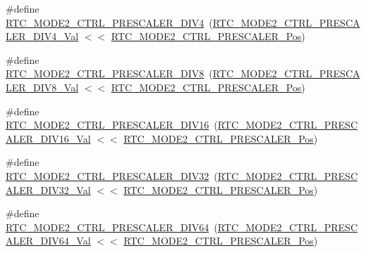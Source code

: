 \begin{DoxyCompactItemize}
\#define \mbox{\hyperlink{group___s_a_m_d21___r_t_c_gaa1062ef2e49ada873506ff5192c86530}{R\+T\+C\+\_\+\+M\+O\+D\+E2\+\_\+\+C\+T\+R\+L\+\_\+\+P\+R\+E\+S\+C\+A\+L\+E\+R\+\_\+\+D\+I\+V4}}~(\mbox{\hyperlink{group___s_a_m_d21___r_t_c_ga7075835115eb6138d8a729068575f7c8}{R\+T\+C\+\_\+\+M\+O\+D\+E2\+\_\+\+C\+T\+R\+L\+\_\+\+P\+R\+E\+S\+C\+A\+L\+E\+R\+\_\+\+D\+I\+V4\+\_\+\+Val}} $<$$<$ \mbox{\hyperlink{group___s_a_m_d21___r_t_c_gab49acaac9629f089845263f149b8a6c0}{R\+T\+C\+\_\+\+M\+O\+D\+E2\+\_\+\+C\+T\+R\+L\+\_\+\+P\+R\+E\+S\+C\+A\+L\+E\+R\+\_\+\+Pos}})
\item 
\#define \mbox{\hyperlink{group___s_a_m_d21___r_t_c_gaa1a6645f4cf5374a82ed8b5401b3302b}{R\+T\+C\+\_\+\+M\+O\+D\+E2\+\_\+\+C\+T\+R\+L\+\_\+\+P\+R\+E\+S\+C\+A\+L\+E\+R\+\_\+\+D\+I\+V8}}~(\mbox{\hyperlink{group___s_a_m_d21___r_t_c_gac387bb79731665371da7bfbd1487dec0}{R\+T\+C\+\_\+\+M\+O\+D\+E2\+\_\+\+C\+T\+R\+L\+\_\+\+P\+R\+E\+S\+C\+A\+L\+E\+R\+\_\+\+D\+I\+V8\+\_\+\+Val}} $<$$<$ \mbox{\hyperlink{group___s_a_m_d21___r_t_c_gab49acaac9629f089845263f149b8a6c0}{R\+T\+C\+\_\+\+M\+O\+D\+E2\+\_\+\+C\+T\+R\+L\+\_\+\+P\+R\+E\+S\+C\+A\+L\+E\+R\+\_\+\+Pos}})
\item 
\#define \mbox{\hyperlink{group___s_a_m_d21___r_t_c_gac709849163d71a7df647b6a64aa3d234}{R\+T\+C\+\_\+\+M\+O\+D\+E2\+\_\+\+C\+T\+R\+L\+\_\+\+P\+R\+E\+S\+C\+A\+L\+E\+R\+\_\+\+D\+I\+V16}}~(\mbox{\hyperlink{group___s_a_m_d21___r_t_c_gafefb030f91512818ec899fe7c2b9d052}{R\+T\+C\+\_\+\+M\+O\+D\+E2\+\_\+\+C\+T\+R\+L\+\_\+\+P\+R\+E\+S\+C\+A\+L\+E\+R\+\_\+\+D\+I\+V16\+\_\+\+Val}} $<$$<$ \mbox{\hyperlink{group___s_a_m_d21___r_t_c_gab49acaac9629f089845263f149b8a6c0}{R\+T\+C\+\_\+\+M\+O\+D\+E2\+\_\+\+C\+T\+R\+L\+\_\+\+P\+R\+E\+S\+C\+A\+L\+E\+R\+\_\+\+Pos}})
\item 
\#define \mbox{\hyperlink{group___s_a_m_d21___r_t_c_ga235eecad438b693a2406262750c048d9}{R\+T\+C\+\_\+\+M\+O\+D\+E2\+\_\+\+C\+T\+R\+L\+\_\+\+P\+R\+E\+S\+C\+A\+L\+E\+R\+\_\+\+D\+I\+V32}}~(\mbox{\hyperlink{group___s_a_m_d21___r_t_c_gaa7ca6312e1627a6a75b67945c657fa8f}{R\+T\+C\+\_\+\+M\+O\+D\+E2\+\_\+\+C\+T\+R\+L\+\_\+\+P\+R\+E\+S\+C\+A\+L\+E\+R\+\_\+\+D\+I\+V32\+\_\+\+Val}} $<$$<$ \mbox{\hyperlink{group___s_a_m_d21___r_t_c_gab49acaac9629f089845263f149b8a6c0}{R\+T\+C\+\_\+\+M\+O\+D\+E2\+\_\+\+C\+T\+R\+L\+\_\+\+P\+R\+E\+S\+C\+A\+L\+E\+R\+\_\+\+Pos}})
\item 
\#define \mbox{\hyperlink{group___s_a_m_d21___r_t_c_ga694ea88de4f53a572e77b8e392199579}{R\+T\+C\+\_\+\+M\+O\+D\+E2\+\_\+\+C\+T\+R\+L\+\_\+\+P\+R\+E\+S\+C\+A\+L\+E\+R\+\_\+\+D\+I\+V64}}~(\mbox{\hyperlink{group___s_a_m_d21___r_t_c_ga7637ad5ae340daefc0484f2e098049ca}{R\+T\+C\+\_\+\+M\+O\+D\+E2\+\_\+\+C\+T\+R\+L\+\_\+\+P\+R\+E\+S\+C\+A\+L\+E\+R\+\_\+\+D\+I\+V64\+\_\+\+Val}} $<$$<$ \mbox{\hyperlink{group___s_a_m_d21___r_t_c_gab49acaac9629f089845263f149b8a6c0}{R\+T\+C\+\_\+\+M\+O\+D\+E2\+\_\+\+C\+T\+R\+L\+\_\+\+P\+R\+E\+S\+C\+A\+L\+E\+R\+\_\+\+Pos}})
$$
\end{DoxyCompactItemize}
